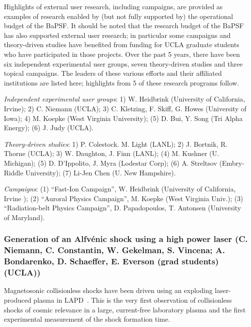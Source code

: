 \documentclass[11pt]{article}
\begin{document}
Highlights of external user research, including campaigns, are
provided as examples of research enabled by (but not fully supported
by) the operational budget of the BaPSF.  It should be noted that the
research budget of the BaPSF has also supported external user
research; in particular some campaigns and theory-driven studies have
benefited from funding for UCLA graduate students who have
participated in those projects.  
Over the past 5 years, there have been six independent experimental
user groups, seven theory-driven studies and three topical
campaigns. The leaders of these various efforts and their affiliated
institutions are listed here; highlights from 5 of these research
programs follow.

\begin{description}
\item{\emph{Independent experimental user groups}}: 1) W. Heidbrink
(University of California, Irvine); 2) C. Niemann (UCLA); 3) C. Kletzing, F. Skiff, G. Howes (University of Iowa); 4) M.
Koepke (West Virginia University); (5) D. Bui, Y. Song (Tri Alpha
Energy); (6) J. Judy (UCLA).

\item{\emph{Theory-driven studies}}: 1) P. Colestock. M. Light (LANL);
2) J. Bortnik, R. Thorne (UCLA); 3) W. Daughton, J. Finn (LANL); (4) M.
Kushner (U. Michigan); (5) D. D'Ippolito, J. Myra (Lodestar Corp); (6)
A. Streltsov (Embry-Riddle University); (7) Li-Jen Chen (U. New
Hampshire).

\item{\emph{Campaigns}}: (1) ``Fast-Ion Campaign'', W. Heidbrink
(University of California, Irvine ); (2) ``Auroral Physics Campaign'', M. Koepke (West Virginia Univ.); (3)
``Radiation-belt Physics Campaign'', D. Papadopoulos, T. Antonsen (University of Maryland).
\end{description}



\subsubsection{Generation of an Alfv\'{e}nic shock
using a high power laser  (C. Niemann, C. Constantin, W. Gekelman,
S. Vincena; A. Bondarenko, D. Schaeffer, E. Everson (grad students) (UCLA))}

Magnetosonic collisionless shocks have been driven using an exploding
laser-produced plasma in LAPD~\citep{schaeffer:2014,niemann:2014}. This is the very first
observation of collisionless shocks of cosmic relevance in a large,
current-free laboratory plasma and the first experimental measurement
of the shock formation time. 
\end{document}

